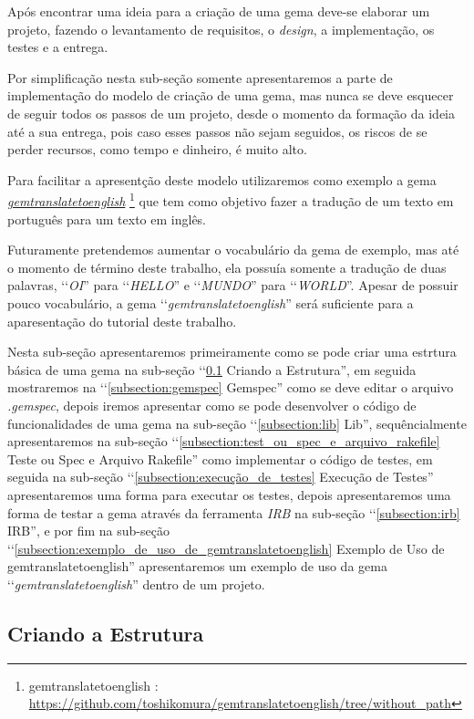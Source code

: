 Após encontrar uma ideia para a criação de uma gema deve-se elaborar um projeto, fazendo o levantamento 
de requisitos, o \emph{design}, a implementação, os testes e a entrega.

Por simplificação nesta sub-seção somente apresentaremos a parte de implementação do modelo de criação de uma
gema, mas nunca se deve esquecer de seguir todos os passos de um projeto, desde o momento da formação da 
ideia até a sua entrega, pois caso esses passos não sejam seguidos, os riscos de se 
perder recursos, como tempo e dinheiro, é muito alto.

Para facilitar a apresentção deste modelo utilizaremos como exemplo a gema 
\emph{\href{https://github.com/toshikomura/gemtranslatetoenglish/tree/without_path}{gemtranslatetoenglish}} 
\footnote{gemtranslatetoenglish : \url{https://github.com/toshikomura/gemtranslatetoenglish/tree/without_path}} que tem 
como objetivo fazer a tradução de um texto em português para um texto em inglês. 

Futuramente pretendemos aumentar o vocabulário da gema de exemplo, mas até o momento de término deste 
trabalho, ela possuía somente a tradução de duas palavras, ‘‘\emph{OI}'' para ‘‘\emph{HELLO}'' e 
‘‘\emph{MUNDO}'' para ‘‘\emph{WORLD}''. Apesar de possuir pouco vocabulário, a gema ‘‘\emph{gemtranslatetoenglish}''
será suficiente para a aparesentação do tutorial deste trabalho. 

Nesta sub-seção apresentaremos primeiramente como se pode criar uma estrtura básica de uma gema na sub-seção 
‘‘\ref{subsection:criando_a_estrutura} Criando a Estrutura'', em seguida mostraremos na 
‘‘\ref{subsection:gemspec} Gemspec'' como se deve editar o arquivo \emph{.gemspec}, depois iremos apresentar 
como se pode desenvolver o código de funcionalidades de uma gema na sub-seção ‘‘\ref{subsection:lib} Lib'', 
sequêncialmente apresentaremos na sub-seção ‘‘\ref{subsection:test_ou_spec_e_arquivo_rakefile} Teste ou Spec e 
Arquivo Rakefile'' como implementar o código de testes, em seguida na sub-seção 
‘‘\ref{subsection:execução_de_testes} Execução de Testes'' apresentaremos uma forma para executar os testes, 
depois apresentaremos uma forma de testar a gema através da ferramenta \emph{IRB} na sub-seção 
‘‘\ref{subsection:irb} IRB'', e por fim na sub-seção ‘‘\ref{subsection:exemplo_de_uso_de_gemtranslatetoenglish} 
Exemplo de Uso de gemtranslatetoenglish'' apresentaremos um exemplo de uso da gema 
‘‘\emph{gemtranslatetoenglish}'' dentro de um projeto.

\subsection{Criando a Estrutura}
\label{subsection:criando_a_estrutura}

